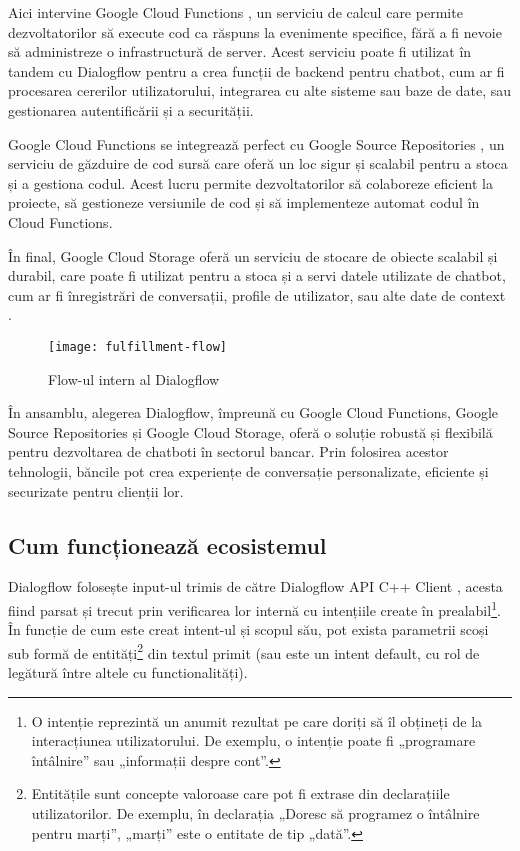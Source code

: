 Aici intervine Google Cloud Functions \cite{google_cloud_functions}, un serviciu de calcul care permite dezvoltatorilor să execute cod ca răspuns la evenimente specifice, fără a fi nevoie să administreze o infrastructură de server. Acest serviciu poate fi utilizat în tandem cu Dialogflow pentru a crea funcții de backend pentru chatbot, cum ar fi procesarea cererilor utilizatorului, integrarea cu alte sisteme sau baze de date, sau gestionarea autentificării și a securității.

Google Cloud Functions se integrează perfect cu Google Source Repositories \cite{google_source_repositories}, un serviciu de găzduire de cod sursă care oferă un loc sigur și scalabil pentru a stoca și a gestiona codul. Acest lucru permite dezvoltatorilor să colaboreze eficient la proiecte, să gestioneze versiunile de cod și să implementeze automat codul în Cloud Functions.

În final, Google Cloud Storage oferă un serviciu de stocare de obiecte scalabil și durabil, care poate fi utilizat pentru a stoca și a servi datele utilizate de chatbot, cum ar fi înregistrări de conversații, profile de utilizator, sau alte date de context \cite{google_cloud_storage}.

\begin{figure}[h]
    \centering
    \texttt{[image: fulfillment-flow]}
    \caption{Flow-ul intern al Dialogflow \cite{google_dialogflow}}
\end{figure}

În ansamblu, alegerea Dialogflow, împreună cu Google Cloud Functions, Google Source Repositories și Google Cloud Storage, oferă o soluție robustă și flexibilă pentru dezvoltarea de chatboti în sectorul bancar. Prin folosirea acestor tehnologii, băncile pot crea experiențe de conversație personalizate, eficiente și securizate pentru clienții lor.

\subsection{Cum funcționează ecosistemul}

Dialogflow folosește input-ul trimis de către Dialogflow API C++ Client \cite{dialogflow_client_library}, acesta fiind parsat și trecut prin verificarea lor internă cu intențiile create în prealabil\footnote{O intenție reprezintă un anumit rezultat pe care doriți să îl obțineți de la interacțiunea utilizatorului. De exemplu, o intenție poate fi „programare întâlnire” sau „informații despre cont”.}. În funcție de cum este creat intent-ul și scopul său, pot exista parametrii scoși sub formă de entități\footnote{Entitățile sunt concepte valoroase care pot fi extrase din declarațiile utilizatorilor. De exemplu, în declarația „Doresc să programez o întâlnire pentru marți”, „marți” este o entitate de tip „dată”.} din textul primit (sau este un intent default, cu rol de legătură între altele cu functionalități).

